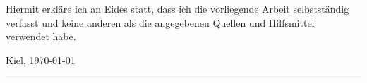 \documentclass[
11pt, %
english, %
singlespacing, %
headsepline, %
]{MastersDoctoralThesis} %
\begin{document}

\begin{declaration}
\addchaptertocentry{\authorshipname} %
\bigskip\noindent Hiermit erkl{\"a}re ich an Eides statt, dass
ich die vorliegende Arbeit selbst\-st{\"a}n\-dig verfasst und keine
anderen als die angegebenen Quellen und Hilfsmittel verwendet habe.\par
\bigskip\noindent Kiel, \today
\vskip 10mm
\hfill\rule{18em}{.3pt}%
% 
% 
% 
% 
% 
%  
%  
\end{declaration}

\cleardoublepage

% 
% 
% 
\end{document}
